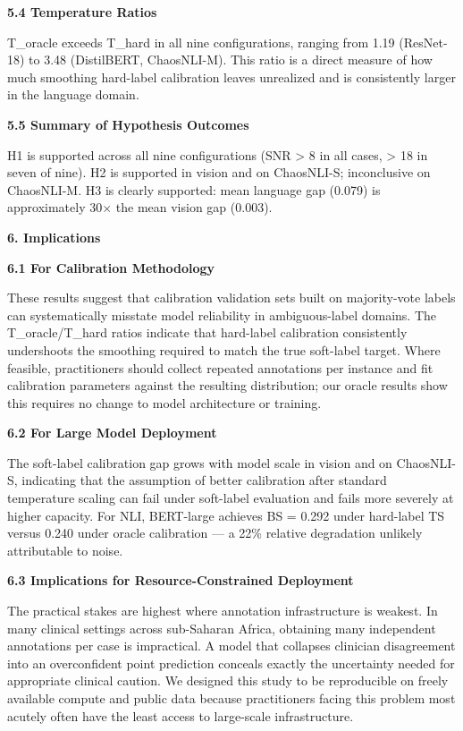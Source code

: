 \documentclass[11pt]{article}
\begin{document}
\textbf{5.4 Temperature Ratios}

T\_oracle exceeds T\_hard in all nine configurations, ranging from 1.19
(ResNet-18) to 3.48 (DistilBERT, ChaosNLI-M). This ratio is a direct
measure of how much smoothing hard-label calibration leaves unrealized
and is consistently larger in the language domain.

\textbf{5.5 Summary of Hypothesis Outcomes}

H1 is supported across all nine configurations (SNR \textgreater{} 8 in
all cases, \textgreater{} 18 in seven of nine). H2 is supported in
vision and on ChaosNLI-S; inconclusive on ChaosNLI-M. H3 is clearly
supported: mean language gap (0.079) is approximately 30$\times$ the mean
vision gap (0.003).

\textbf{6. Implications}

\textbf{6.1 For Calibration Methodology}

These results suggest that calibration validation sets built on
majority-vote labels can systematically misstate model reliability in
ambiguous-label domains. The T\_oracle/T\_hard ratios indicate that
hard-label calibration consistently undershoots the smoothing required
to match the true soft-label target. Where feasible, practitioners
should collect repeated annotations per instance and fit calibration
parameters against the resulting distribution; our oracle results show
this requires no change to model architecture or training.

\textbf{6.2 For Large Model Deployment}

The soft-label calibration gap grows with model scale in vision and on
ChaosNLI-S, indicating that the assumption of better calibration after
standard temperature scaling can fail under soft-label evaluation and
fails more severely at higher capacity. For NLI, BERT-large achieves BS
= 0.292 under hard-label TS versus 0.240 under oracle calibration --- a
22\% relative degradation unlikely attributable to noise.

\textbf{6.3 Implications for Resource-Constrained Deployment}

The practical stakes are highest where annotation infrastructure is
weakest. In many clinical settings across sub-Saharan Africa, obtaining
many independent annotations per case is impractical. A model that
collapses clinician disagreement into an overconfident point prediction
conceals exactly the uncertainty needed for appropriate clinical
caution. We designed this study to be reproducible on freely available
compute and public data because practitioners facing this problem most
acutely often have the least access to large-scale infrastructure.
\end{document}
